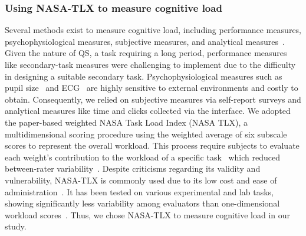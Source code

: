 \subsubsection{Using NASA-TLX to measure cognitive load}
Several methods exist to measure cognitive load, including performance measures, psychophysiological measures, subjective measures, and analytical measures~\cite{gaoMentalWorkloadMeasurement2013}. Given the nature of QS, a task requiring a long period, performance measures like secondary-task measures were challenging to implement due to the difficulty in designing a suitable secondary task. Psychophysiological measures such as pupil size~\cite{palinkoEstimatingCognitiveLoad2010} and ECG~\cite{haapalainenPsychophysiologicalMeasuresAssessing2010} are highly sensitive to external environments and costly to obtain. Consequently, we relied on subjective measures via self-report surveys and analytical measures like time and clicks collected via the interface. We adopted the paper-based weighted NASA Task Load Index (NASA TLX), a multidimensional scoring procedure using the weighted average of six subscale scores to represent the overall workload. This process require subjects to evaluate each weight's contribution to the workload of a specific task~\cite{hart1988development, hartNasaTaskLoadIndex2006, cain2007review} which reduced between-rater variability~\cite{cain2007review}. Despite criticisms regarding its validity and vulnerability, NASA-TLX is commonly used due to its low cost and ease of administration~\cite{gaoMentalWorkloadMeasurement2013}. It has been tested on various experimental and lab tasks, showing significantly less variability among evaluators than one-dimensional workload scores~\cite{rubioEvaluationSubjectiveMental2004}. Thus, we chose NASA-TLX to measure cognitive load in our study.




